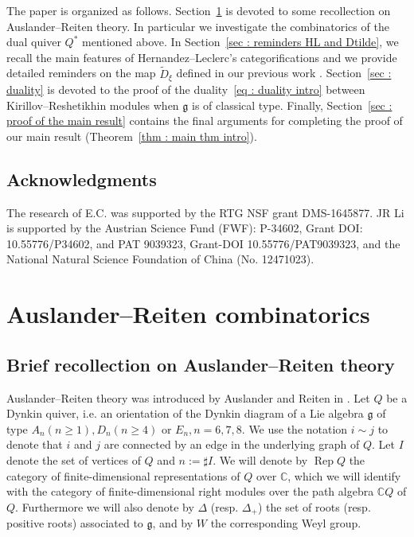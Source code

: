 \documentclass[12pt]{amsart}
\theoremstyle{plain}
\theoremstyle{definition}
\numberwithin{equation}{section}
\newcommand{\tdxi}{\widetilde{D}_{\xi}}
\DeclareMathOperator*{\rep}{Rep}
\begin{document}
The paper is organized as follows. Section~\ref{sec : AR} is devoted to some recollection on Auslander--Reiten theory. In particular we investigate the combinatorics of the dual quiver $Q^{*}$ mentioned above. In Section~\ref{sec : reminders HL and Dtilde}, we recall the main features of Hernandez--Leclerc's categorifications and we provide detailed reminders on the map $\tdxi$ defined in our previous work \cite{CasbiLi}. Section~\ref{sec : duality} is devoted to the proof of the duality~\eqref{eq : duality intro} between Kirillov--Reshetikhin modules when $\mathfrak{g}$ is of classical type. Finally, Section~\ref{sec : proof of the main result} contains the final arguments for completing the proof of our main result (Theorem~\ref{thm : main thm intro}). 

\subsection*{Acknowledgments}
The research of E.C. was supported by the RTG NSF grant DMS-1645877.
JR Li is supported by the Austrian Science Fund (FWF): P-34602, Grant DOI: 10.55776/P34602, and PAT 9039323, Grant-DOI 10.55776/PAT9039323, and the National Natural Science Foundation of China (No. 12471023). 

\section{Auslander--Reiten combinatorics}
  \label{sec : AR}


   \subsection{Brief recollection on Auslander--Reiten theory}
    \label{sec : reminders on AR}
Auslander--Reiten theory was introduced by Auslander and Reiten in \cite{AR75}. Let $Q$ be a Dynkin quiver, i.e. an orientation of the Dynkin diagram of a Lie algebra $\mathfrak{g}$ of type $A_n (n \geq 1) , D_n (n \geq 4)$ or $E_n , n=6,7,8$. We use the notation $i \sim j$ to denote that $i$ and $j$ are connected 
by an edge in the underlying graph of $Q$. Let $I$ denote the set of vertices of $Q$ and $n:= \sharp I$. We will denote by $\rep Q$ the category of finite-dimensional representations of $Q$ over $\mathbb{C}$, which we will identify with the category of finite-dimensional right modules over the path algebra $\mathbb{C}Q$ of $Q$. Furthermore we will also denote by $\Delta$ (resp. $\Delta_+$) the set of roots (resp. positive roots) associated to $\mathfrak{g}$, and by $W$ the corresponding Weyl group. 
\end{document}
